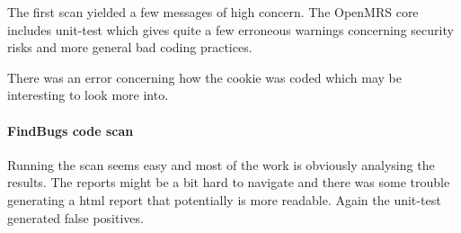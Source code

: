 \documentclass{article}
\begin{document}
  The first scan yielded a few messages of high concern. The OpenMRS core
  includes unit-test which gives quite a few erroneous warnings concerning
  security risks and more general bad coding practices. 

  There was an error concerning how the cookie was coded which may be
  interesting to look more into.

\paragraph{FindBugs code scan}

  Running the scan seems easy and most of the work is obviously analysing the
  results. The reports might be a bit hard to navigate and there was some
  trouble generating a html report that potentially is more readable. Again the
  unit-test generated false positives.
\end{document}
